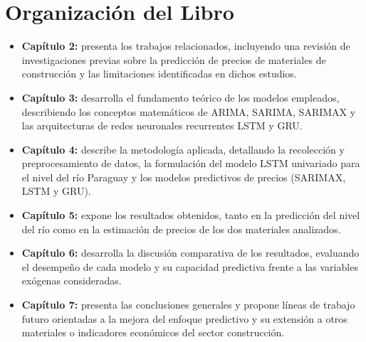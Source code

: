 \section{Organización del Libro}
\begin{itemize}
\item \textbf{Capítulo 2:} presenta los trabajos relacionados, incluyendo una revisión de investigaciones previas sobre la predicción de precios de materiales de construcción y las limitaciones identificadas en dichos estudios.
\item \textbf{Capítulo 3:} desarrolla el fundamento teórico de los modelos empleados, describiendo los conceptos matemáticos de ARIMA, SARIMA, SARIMAX y las arquitecturas de redes neuronales recurrentes LSTM y GRU.
\item \textbf{Capítulo 4:} describe la metodología aplicada, detallando la recolección y preprocesamiento de datos, la formulación del modelo LSTM univariado para el nivel del río Paraguay y los modelos predictivos de precios (SARIMAX, LSTM y GRU).
\item \textbf{Capítulo 5:} expone los resultados obtenidos, tanto en la predicción del nivel del río como en la estimación de precios de los dos materiales analizados.
\item \textbf{Capítulo 6:} desarrolla la discusión comparativa de los resultados, evaluando el desempeño de cada modelo y su capacidad predictiva frente a las variables exógenas consideradas.
\item \textbf{Capítulo 7:} presenta las conclusiones generales y propone líneas de trabajo futuro orientadas a la mejora del enfoque predictivo y su extensión a otros materiales o indicadores económicos del sector construcción.
\end{itemize}
